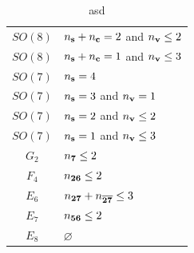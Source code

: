 \documentclass[letterpaper, 11pt]{article}
\begin{document}
{\begin{table}[tbp]
\begin{tabular}{@{}cl@{}}
    $SO(8)$  & $n_{\bf s} + n_{\bf c} = 2$ and  $n_{\bf v}  \leq 2$\\
    $SO(8)$  & $n_{\bf s} + n_{\bf c} = 1$ and  $n_{\bf v}  \leq 3$\\
    $SO(7)$  & $n_{\bf s} = 4$ \\
    $SO(7)$  & $n_{\bf s} = 3$ and  $n_{\bf v}  =1$\\
    $SO(7)$  & $n_{\bf s} = 2$ and  $n_{\bf v}  \leq 2$\\
    $SO(7)$  & $n_{\bf s} = 1$ and  $n_{\bf v}  \leq 3$\\
    $G_2$  & $n_{\bf 7}\leq 2$ \\
    $F_4$  & $n_{\bf 26}\leq 2$ \\
    $E_6$  & $n_{\bf 27}+ n_{\bf \overline{27}} \leq 3$\\
    $E_7$  & $n_{\bf 56} \leq 2$ \\ 
    $E_8$  & $\varnothing$ \\ \bottomrule
    \end{tabular}
    \caption{asd}
    \label{tbl:exceptional-theory}
\end{table}



}
\end{document}
